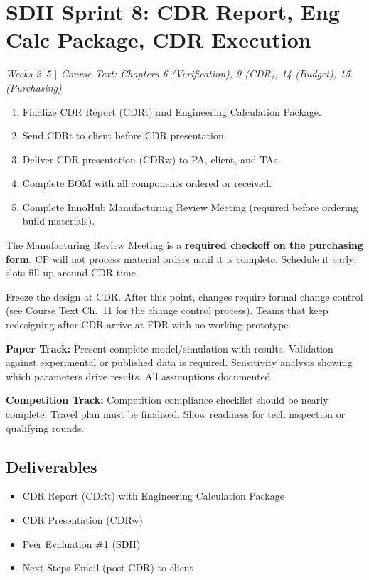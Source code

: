 \section{SDII Sprint 8: CDR Report, Eng Calc Package, CDR Execution}
\textit{Weeks 2--5 $|$ Course Text: Chapters 6 (Verification), 9 (CDR), 14 (Budget), 15 (Purchasing)}

\begin{priorities}
\begin{enumerate}[nosep]
\item Finalize CDR Report (CDRt) and Engineering Calculation Package.
\item Send CDRt to client before CDR presentation.
\item Deliver CDR presentation (CDRw) to PA, client, and TAs.
\item Complete BOM with all components ordered or received.
\item Complete InnoHub Manufacturing Review Meeting (required before ordering build materials).
\end{enumerate}
\end{priorities}

\begin{warnbox}
The Manufacturing Review Meeting is a \textbf{required checkoff on the purchasing form}. CP will not process material orders until it is complete. Schedule it early; slots fill up around CDR time.
\end{warnbox}

\begin{protip}
Freeze the design at CDR. After this point, changes require formal change control (see Course Text Ch.~11 for the change control process). Teams that keep redesigning after CDR arrive at FDR with no working prototype.
\end{protip}

\begin{faqbox}
\textbf{Paper Track:} Present complete model/simulation with results. Validation against experimental or published data is required. Sensitivity analysis showing which parameters drive results. All assumptions documented.

\textbf{Competition Track:} Competition compliance checklist should be nearly complete. Travel plan must be finalized. Show readiness for tech inspection or qualifying rounds.
\end{faqbox}

\subsection{Deliverables}
\begin{itemize}[nosep,leftmargin=1.5em]
\item CDR Report (CDRt) with Engineering Calculation Package
\item CDR Presentation (CDRw)
\item Peer Evaluation \#1 (SDII)
\item Next Steps Email (post-CDR) to client
\end{itemize}



